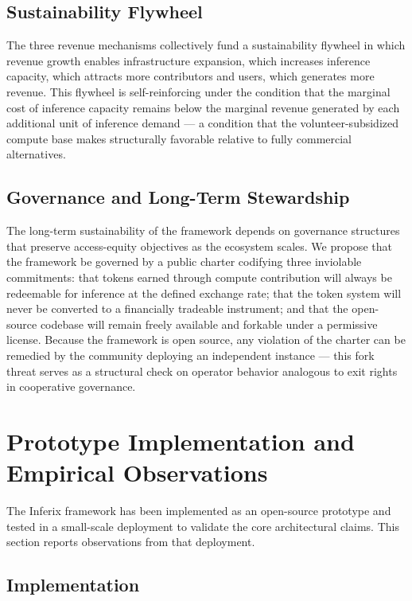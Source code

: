 \documentclass[12pt]{article}
\begin{document}
\subsection{Sustainability Flywheel}

The three revenue mechanisms collectively fund a sustainability flywheel in which revenue growth enables infrastructure expansion, which increases inference capacity, which attracts more contributors and users, which generates more revenue. This flywheel is self-reinforcing under the condition that the marginal cost of inference capacity remains below the marginal revenue generated by each additional unit of inference demand — a condition that the volunteer-subsidized compute base makes structurally favorable relative to fully commercial alternatives.

\subsection{Governance and Long-Term Stewardship}

The long-term sustainability of the framework depends on governance structures that preserve access-equity objectives as the ecosystem scales. We propose that the framework be governed by a public charter codifying three inviolable commitments: that tokens earned through compute contribution will always be redeemable for inference at the defined exchange rate; that the token system will never be converted to a financially tradeable instrument; and that the open-source codebase will remain freely available and forkable under a permissive license. Because the framework is open source, any violation of the charter can be remedied by the community deploying an independent instance — this fork threat serves as a structural check on operator behavior analogous to exit rights in cooperative governance.

\section{Prototype Implementation and Empirical Observations}
\label{sec:empirical}

The Inferix framework has been implemented as an open-source prototype and tested in a small-scale deployment to validate the core architectural claims. This section reports observations from that deployment.

\subsection{Implementation}
\end{document}
